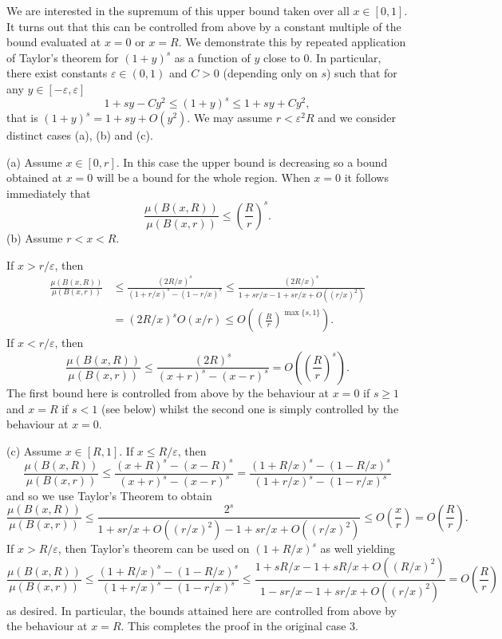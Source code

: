 We are interested in the supremum of this upper bound taken over all $x \in [0,1]$.  It turns out that this can be controlled from above by a constant  multiple of the bound evaluated at $x=0$ or $x=R$.  We demonstrate this by repeated application of Taylor's theorem for   $(1+y)^s$ as a function of $y$ close to 0. In particular,   there exist constants $\varepsilon \in (0,1)$ and $C > 0$ (depending only on $s$) such that for any $y \in [-\varepsilon, \varepsilon]$
\[
1 + s y - C y^2 \le (1+y)^s \le 1 + s y + C y^2,
\]
that is $ (1+y)^s = 1 + s y +O( y^2)$.  We may assume $r<\varepsilon^2 R$ and we consider distinct cases (a), (b) and (c).



\noindent (a) Assume $x\in [0,r]$.  In this case the upper bound is decreasing so a bound obtained at $x = 0$ will be a bound for the whole region. When $x=0$ it follows immediately that
\[
\frac{\mu(B(x,R))}{\mu(B(x,r))} \le \left(\frac{R}{r}\right)^s.
\]
\noindent (b) Assume $r < x < R$. 

If  $x > r/\varepsilon$, then 
\begin{align*}
\frac{\mu(B(x,R))}{\mu(B(x,r))} &\le \frac{(2R/x)^s}{(1+r/x)^s - (1-r/x)^s} \le \frac{(2R/x)^s}{1+sr/x-1+sr/x + O((r/x)^2)}\\ 
&=  (2R/x)^s O(x/r) \le O\left(\left(\frac{R}{r}\right)^{\max\{s,1\}}\right).    
\end{align*}
If $x < r/\varepsilon$, then 
\[
\frac{\mu(B(x,R))}{\mu(B(x,r))} \le \frac{(2R)^s}{(x+r)^s - (x-r)^s} = O\left(\left(\frac{R}{r}\right)^s\right).
\]
The first bound here is controlled from above by the behaviour at  $x=0$ if $s \geq 1$ and $x=R$ if $s <1$ (see below) whilst the second one is simply controlled by the behaviour at $x=0$. 


\noindent (c) Assume  $x \in [R,1]$. If $x \leq R/\varepsilon$, then 
\[
\frac{\mu(B(x,R))}{\mu(B(x,r))} \le \frac{(x+R)^s - (x-R)^s}{(x+r)^s - (x-r)^s} = \frac{(1+R/x)^s - (1-R/x)^s}{(1+r/x)^s - (1-r/x)^s}
\]
and so we use Taylor's Theorem  to obtain
\[
\frac{\mu(B(x,R))}{\mu(B(x,r))} \le \frac{2^s}{1+sr/x + O((r/x)^2)- 1 + sr/x + O((r/x)^2)} \le O\left(\frac{x}{r}\right) = O\left(\frac{R}{r}\right).
\]
If $x > R/\varepsilon$, then  Taylor's theorem can be used on $(1+R/x)^s$ as well yielding
\[
\frac{\mu(B(x,R))}{\mu(B(x,r))} \le \frac{(1+R/x)^s - (1-R/x)^s}{(1+r/x)^s - (1-r/x)^s} \le \frac{1+sR/x - 1 + sR/x + O((R/x)^2)}{1-sr/x -1 + sr/x + O((r/x)^2)} =O\left(\frac{R}{r}\right)
\]
as desired. In particular, the bounds attained here are controlled from above by the  behaviour at $x= R$.   This completes the proof in the original case 3.



